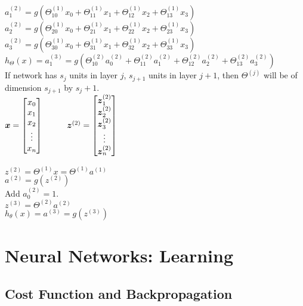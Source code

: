 \documentclass{article}
\newcommand\tab[1][1cm]{\hspace*{#1}}
\newcommand{\vect}[1]{\boldsymbol{#1}}
\begin{document}
$a_1^{(2)} = g(\Theta^{(1)}_{10} x_0 + \Theta^{(1)}_{11} x_1 + \Theta^{(1)}_{12} x_2 + \Theta^{(1)}_{13} x_3)$ \\
$a_2^{(2)} = g(\Theta^{(1)}_{20} x_0 + \Theta^{(1)}_{21} x_1 + \Theta^{(1)}_{22} x_2 + \Theta^{(1)}_{23} x_3)$ \\
$a_3^{(2)} = g(\Theta^{(1)}_{30} x_0 + \Theta^{(1)}_{31} x_1 + \Theta^{(1)}_{32} x_2 + \Theta^{(1)}_{33} x_3)$ \\

$h_\Theta(x) = a_1^{(3)} = g(\Theta^{(2)}_{10} a_0^{(2)} + \Theta^{(2)}_{11} a_1^{(2)} + \Theta^{(2)}_{12} a_2^{(2)} + \Theta^{(2)}_{13} a_3^{(2)})$ \\

If network has $s_j$ units in layer $j$, $s_{j+1}$ units in layer $j+1$, then $\Theta^{(j)}$ will be of dimension $s_{j+1}$ by $s_{j} + 1$. \\

$\vect{x} = 
\begin{bmatrix}
x_0 \\ x_1 \\ x_2 \\ \vdots \\ x_n 
\end{bmatrix}
\tab
\vect{z}^{(2)} = 
\begin{bmatrix}
\vect{z}^{(2)}_1 \\ \vect{z}^{(2)}_2 \\ \vect{z}^{(2)}_3 \\ \vdots \\ \vect{z}^{(2)}_n 
\end{bmatrix} \\\\$

$z^{(2)} = \Theta^{(1)}x = \Theta^{(1)} a^{(1)}$\\
$a^{(2)} = g(z^{(2)})$\\

Add $a_0^{(2)} = 1$.\\

$z^{(3)} = \Theta^{(2)}a^{(2)}$\\
$h_\theta(x) = a^{(3)} = g(z^{(3)})$

\section{Neural Networks: Learning}
\subsection{Cost Function and Backpropagation}
\end{document}
